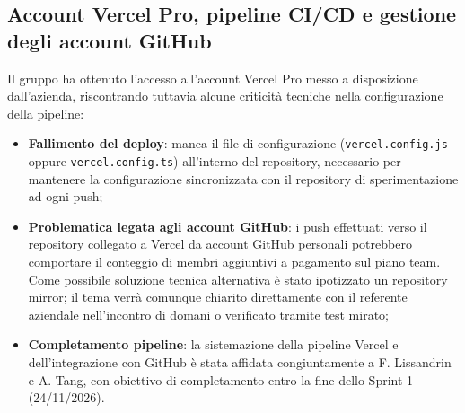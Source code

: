 \subsection{Account Vercel Pro, pipeline CI/CD e gestione degli account GitHub}
Il gruppo ha ottenuto l'accesso all'account Vercel Pro messo a disposizione dall'azienda, riscontrando tuttavia alcune criticità tecniche nella configurazione della pipeline:
\begin{itemize}
    \item \textbf{Fallimento del deploy}: manca il file di configurazione (\texttt{vercel.config.js} oppure \texttt{vercel.config.ts}) all'interno del repository, necessario per mantenere la configurazione sincronizzata con il repository di sperimentazione ad ogni push;
    \item \textbf{Problematica legata agli account GitHub}: i push effettuati verso il repository collegato a Vercel da account GitHub personali potrebbero comportare il conteggio di membri aggiuntivi a pagamento sul piano team. Come possibile soluzione tecnica alternativa è stato ipotizzato un repository mirror; il tema verrà comunque chiarito direttamente con il referente aziendale nell'incontro di domani o verificato tramite test mirato;
    \item \textbf{Completamento pipeline}: la sistemazione della pipeline Vercel e dell'integrazione con GitHub è stata affidata congiuntamente a F. Lissandrin e A. Tang, con obiettivo di completamento entro la fine dello Sprint 1 (24/11/2026).
\end{itemize}

\newpage

